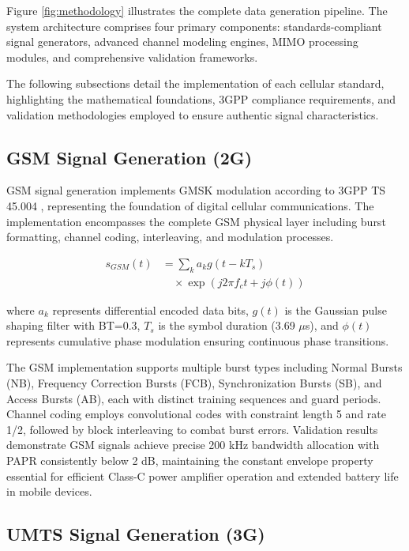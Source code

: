 \documentclass[twocolumn]{article}
\begin{document}
Figure \ref{fig:methodology} illustrates the complete data generation pipeline. The system architecture comprises four primary components: standards-compliant signal generators, advanced channel modeling engines, MIMO processing modules, and comprehensive validation frameworks.

The following subsections detail the implementation of each cellular standard, highlighting the mathematical foundations, 3GPP compliance requirements, and validation methodologies employed to ensure authentic signal characteristics.

\subsection{GSM Signal Generation (2G)}

GSM signal generation implements GMSK modulation according to 3GPP TS 45.004 \cite{3gpp2018ts45004}, representing the foundation of digital cellular communications. The implementation encompasses the complete GSM physical layer including burst formatting, channel coding, interleaving, and modulation processes.

\begin{align}
s_{GSM}(t) &= \sum_{k} a_k g(t-kT_s) \nonumber \\
&\quad \times \exp(j2\pi f_c t + j\phi(t))
\end{align}

where $a_k$ represents differential encoded data bits, $g(t)$ is the Gaussian pulse shaping filter with BT=0.3, $T_s$ is the symbol duration (3.69 $\mu$s), and $\phi(t)$ represents cumulative phase modulation ensuring continuous phase transitions.

The GSM implementation supports multiple burst types including Normal Bursts (NB), Frequency Correction Bursts (FCB), Synchronization Bursts (SB), and Access Bursts (AB), each with distinct training sequences and guard periods. Channel coding employs convolutional codes with constraint length 5 and rate 1/2, followed by block interleaving to combat burst errors. Validation results demonstrate GSM signals achieve precise 200 kHz bandwidth allocation with PAPR consistently below 2 dB, maintaining the constant envelope property essential for efficient Class-C power amplifier operation and extended battery life in mobile devices.

\subsection{UMTS Signal Generation (3G)}
\end{document}
